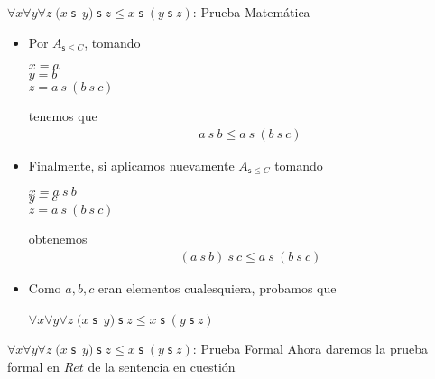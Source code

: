 \documentclass[10pt]{beamer}
\newcommand{\NsLesCot}{{A}_{\mathsf{s}\leq C}}
\newcommand{\assoc}{\forall x\forall y\forall
z\;(x\;\mathsf{s}$\ $y)\;\mathsf{s}\;z\leq x\;\mathsf{s}\;(y\;\mathsf{s}\;z)}
\begin{document}
\begin{frame}{$\assoc$: Prueba Matemática}
  \begin{itemize}[<+->]
    \item Por $\NsLesCot$, tomando \\
      \begin{center}
        $x = a$ \\
        $y = b$ \\
        $z = a\ s\ (b\ s\ c)$
      \end{center}
      tenemos que
        \begin{align}
          &a\ s\ b  \leq a\ s\ (b\ s\ c) \label{eq7}
        \end{align}

    \item Finalmente, si aplicamos nuevamente $\NsLesCot$ tomando\\
    \begin{center}
      $x = a\ s\ b$ \\
      $y = c$ \\
      $z = a\ s\ (b\ s\ c)$
    \end{center}

     obtenemos
      \begin{align}
        &(a\ s\ b)\ s\ c  \leq a\ s\ (b\ s\ c) \label{eq7}
      \end{align}
    \item Como $a, b, c$ eran elementos cualesquiera, probamos que
      \begin{center}
        $\assoc$
      \end{center}
  \end{itemize}
\end{frame}

\begin{frame}{$\assoc$: Prueba Formal}
  Ahora daremos la prueba formal en $Ret$ de la sentencia en cuestión
\end{frame}
\end{document}

